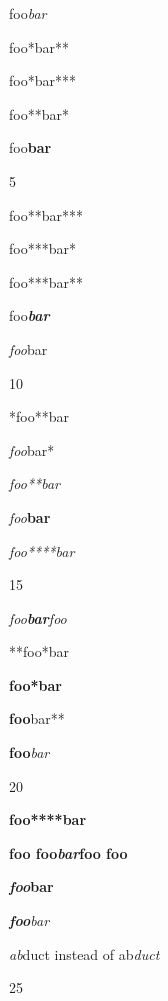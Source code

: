 
\def\mytitle{Advanced Emph and Strong}


foo\emph{bar}

foo*bar**

foo*bar***

foo**bar*

foo\textbf{bar}

5

foo**bar***

foo***bar*

foo***bar**

foo\textbf{\emph{bar}}

\emph{foo}bar

10

*foo**bar

\emph{foo}bar*

\emph{foo**bar}

\emph{foo}\textbf{bar}

\emph{foo****bar}

15

\emph{foo\textbf{bar}foo}

**foo*bar

\textbf{foo*bar}

\textbf{foo}bar**

\textbf{foo}\emph{bar}

20

\textbf{foo****bar}

\textbf{foo foo\emph{bar}foo foo}

\textbf{\emph{foo}bar}

\emph{\textbf{foo}bar}

\emph{ab}duct instead of ab\emph{duct}

25



